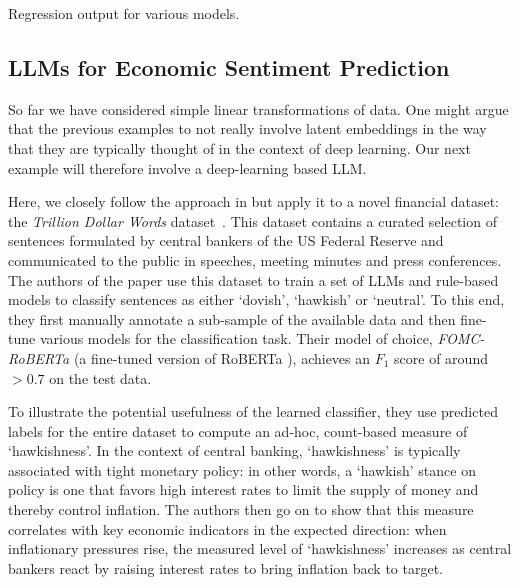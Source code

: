 \documentclass{article}
\theoremstyle{plain}
\theoremstyle{definition}
\theoremstyle{remark}
\begin{document}
\begin{table}
\caption{Regression output for various models.}\label{tab-reg}%

\end{table}

\subsection{LLMs for Economic Sentiment Prediction}\label{ex-llm}

So far we have considered simple linear transformations of data. One might argue that the previous examples to not really involve latent embeddings in the way that they are typically thought of in the context of deep learning. Our next example will therefore involve a deep-learning based LLM.

Here, we closely follow the approach in \citet{gurnee2023languagev2} but apply it to a novel financial dataset: the \emph{Trillion Dollar Words} dataset~\cite{shah2023trillion}. This dataset contains a curated selection of sentences formulated by central bankers of the US Federal Reserve and communicated to the public in speeches, meeting minutes and press conferences. The authors of the paper use this dataset to train a set of LLMs and rule-based models to classify sentences as either `dovish', `hawkish' or `neutral'. To this end, they first manually annotate a sub-sample of the available data and then fine-tune various models for the classification task. Their model of choice, \emph{FOMC-RoBERTa} (a fine-tuned version of RoBERTa \citep{liu2019roberta}), achieves an \(F_1\) score of around \(>0.7\) on the test data. 

To illustrate the potential usefulness of the learned classifier, they use predicted labels for the entire dataset to compute an ad-hoc, count-based measure of `hawkishness'. In the context of central banking, `hawkishness' is typically associated with tight monetary policy: in other words, a `hawkish' stance on policy is one that favors high interest rates to limit the supply of money and thereby control inflation. The authors then go on to show that this measure correlates with key economic indicators in the expected direction: when inflationary pressures rise, the measured level of `hawkishness' increases as central bankers react by raising interest rates to bring inflation back to target.
\end{document}
